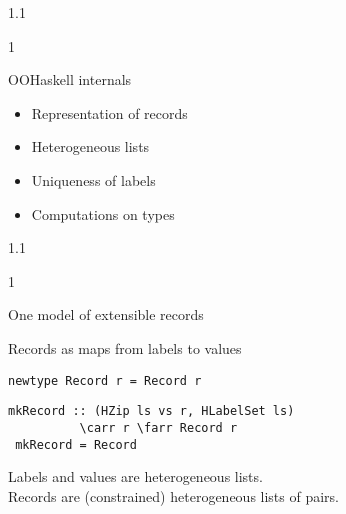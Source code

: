 \documentclass{slides}
\newenvironment{myslide}{\begin{slide}\color{Blue}\begin{boxedminipage}{1.1\hsize}\begin{boxedminipage}{1\hsize}\color{Black}
\vspace{-170\in}
}{%
\smallskip
\end{boxedminipage}
\end{boxedminipage}
\end{slide}}
\newenvironment{myslide}{\begin{slide}
}{%
\end{slide}}
\newenvironment{myslide}{\begin{slide}\color{White}\begin{boxedminipage}{1.1\hsize}\color{Black}
\vspace{-170\in}
}{%
\smallskip
\end{boxedminipage}
\end{slide}}
\newcommand{\littleskip}{\topsep8pt \parskip8pt \partopsep8pt}
\newcommand{\header}[1]{{\large \color{Red} #1}}
\newcommand{\blau}[1]{{\vspace{-50\in}\normalsize \color{Blue} #1}}
\newcommand{\farr}{\ensuremath{\to}}
\newcommand{\carr}{\ensuremath{\Rightarrow}}
\begin{document}
\begin{myslide}

\header{OOHaskell internals}

\bigskip

\littleskip\begin{itemize}
\item Representation of records
\item Heterogeneous lists
\item Uniqueness of labels
\item Computations on types
\end{itemize}

\end{myslide}






\begin{myslide}

\header{One model of extensible records}

\vspace{-77\in}

\blau{Records as maps from labels to values}

\smallskip

\begin{Verbatim}[fontfamily=courier,fontsize=\normalsize,commandchars=\\\{\}]
 newtype Record r = Record r
\end{Verbatim}

\smallskip

\begin{Verbatim}[fontfamily=courier,fontsize=\normalsize,commandchars=\\\{\}]
 mkRecord :: (HZip ls vs r, HLabelSet ls)
          \carr r \farr Record r
 mkRecord = Record
\end{Verbatim}

\bigskip

Labels and values are heterogeneous lists.\\
Records are (constrained) heterogeneous lists of pairs.

\end{myslide}



\end{document}
